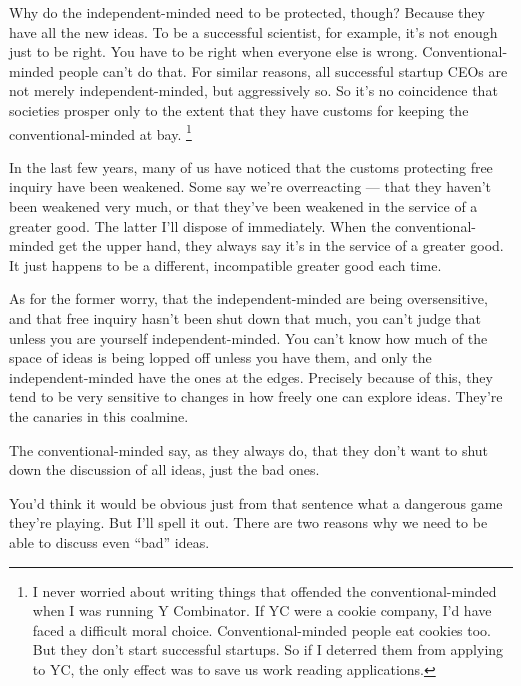 Why do the independent-minded need to be protected, though? Because they
have all the new ideas. To be a successful scientist, for example, it's
not enough just to be right. You have to be right when everyone else is
wrong. Conventional-minded people can't do that. For similar reasons,
all successful startup CEOs are not merely independent-minded, but
aggressively so. So it's no coincidence that societies prosper only to
the extent that they have customs for keeping the conventional-minded at
bay. \footnote{I never worried about writing things that offended the
conventional-minded when I was running Y Combinator. If YC were a cookie
company, I'd have faced a difficult moral choice. Conventional-minded
people eat cookies too. But they don't start successful startups. So if
I deterred them from applying to YC, the only effect was to save us work
reading applications.}

In the last few years, many of us have noticed that the customs
protecting free inquiry have been weakened. Some say we're overreacting
--- that they haven't been weakened very much, or that they've been
weakened in the service of a greater good. The latter I'll dispose of
immediately. When the conventional-minded get the upper hand, they
always say it's in the service of a greater good. It just happens to be
a different, incompatible greater good each time.

As for the former worry, that the independent-minded are being
oversensitive, and that free inquiry hasn't been shut down that much,
you can't judge that unless you are yourself independent-minded. You
can't know how much of the space of ideas is being lopped off unless you
have them, and only the independent-minded have the ones at the edges.
Precisely because of this, they tend to be very sensitive to changes in
how freely one can explore ideas. They're the canaries in this coalmine.

The conventional-minded say, as they always do, that they don't want to
shut down the discussion of all ideas, just the bad ones.

You'd think it would be obvious just from that sentence what a dangerous
game they're playing. But I'll spell it out. There are two reasons why
we need to be able to discuss even ``bad'' ideas.

